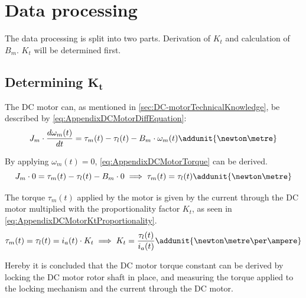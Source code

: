 \section*{Data processing}
The data processing is split into two parts. Derivation of $K_t$ and calculation of $B_m$. $K_t$ will be determined first.

\subsection*{Determining $\boldsymbol{K_t}$}
The DC motor can, as mentioned in \autoref{sec:DC-motorTechnicalKnowledge}, be described by \autoref{eq:AppendixDCMotorDiffEquation}:
\begin{equation}\label{eq:AppendixDCMotorDiffEquation}
J_m \cdot \frac{d\omega_{m}(t)}{d t} = \tau_{m}(t) - \tau_{l}(t) - B_m \cdot \omega_{m}(t)	\addunit{\newton\metre}
\end{equation}
\startexplain
{}
\stopexplain

By applying $\omega_m(t)=0$, \autoref{eq:AppendixDCMotorTorque} can be derived.
\begin{equation}\label{eq:AppendixDCMotorTorque}
J_m \cdot 0 = \tau_{m}(t) - \tau_{l}(t) - B_m \cdot 0 \implies \tau_{m}(t) = \tau_{l}(t) \addunit{\newton\metre}
\end{equation}

The torque $\tau_{m}(t)$ applied by the motor is given by the current through the DC motor multiplied with the proportionality factor $K_t$, as seen in \autoref{eq:AppendixDCMotorKtProportionality}.
\begin{equation}\label{eq:AppendixDCMotorKtProportionality}
\tau_{m}(t)= \tau_l(t) = i_a(t) \cdot K_t \implies K_t = \frac{\tau_{l}(t)}{i_a(t)} \addunit{\newton\metre\per\ampere}
\end{equation}
\startexplain
{}
\stopexplain

Hereby it is concluded that the DC motor torque constant can be derived by locking the DC motor rotor shaft in place, and measuring the torque applied to the locking mechanism and the current through the DC motor.

